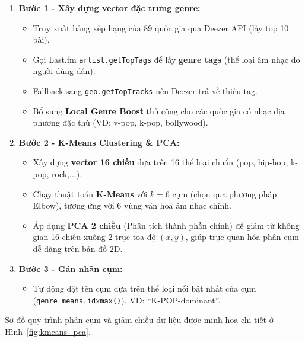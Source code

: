 \documentclass[12pt,a4paper]{report}
\begin{document}
\begin{enumerate}[leftmargin=*]
    \item \textbf{Bước 1 - Xây dựng vector đặc trưng genre:} 
    \begin{itemize}
        \item Truy xuất bảng xếp hạng của 89 quốc gia qua Deezer API (lấy top 10 bài).
        \item Gọi Last.fm \texttt{artist.getTopTags} để lấy \textbf{genre tags} (thể loại âm nhạc do người dùng dán).
        \item Fallback sang \texttt{geo.getTopTracks} nếu Deezer trả về thiếu tag. 
        \item Bổ sung \textbf{Local Genre Boost} thủ công cho các quốc gia có nhạc địa phương đặc thù (VD: v-pop, k-pop, bollywood).
    \end{itemize}

    \item \textbf{Bước 2 - K-Means Clustering \& PCA:} 
    \begin{itemize}
        \item Xây dựng \textbf{vector 16 chiều} dựa trên 16 thể loại chuẩn (pop, hip-hop, k-pop, rock,...).
        \item Chạy thuật toán \textbf{K-Means} với $k=6$ cụm (chọn qua phương pháp Elbow), tương ứng với 6 vùng văn hoá âm nhạc chính.
        \item Áp dụng \textbf{PCA 2 chiều} (Phân tích thành phần chính) để giảm từ không gian 16 chiều xuống 2 trục tọa độ $(x, y)$, giúp trực quan hóa phân cụm dễ dàng trên bản đồ 2D.
    \end{itemize}

    \item \textbf{Bước 3 - Gán nhãn cụm:} 
    \begin{itemize}
        \item Tự động đặt tên cụm dựa trên thể loại nổi bật nhất của cụm (\texttt{genre\_means.\allowbreak{}idxmax()}). VD: ``K-POP-dominant''.
    \end{itemize}
\end{enumerate}

Sơ đồ quy trình phân cụm và giảm chiều dữ liệu được minh hoạ chi tiết ở Hình~\ref{fig:kmeans_pca}.
\end{document}
